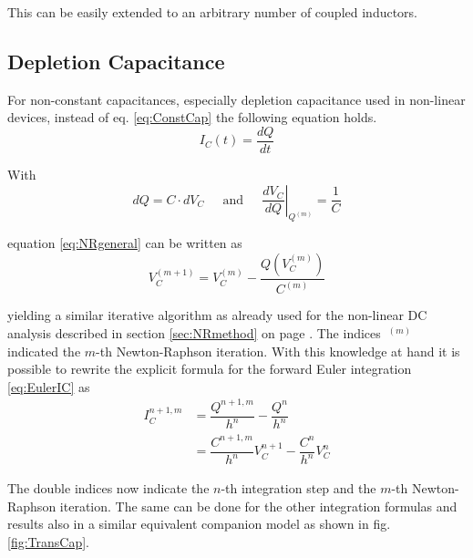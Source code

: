 This can be easily extended to an arbitrary number of coupled
inductors.


\subsection{Depletion Capacitance}

For non-constant capacitances, especially depletion capacitance used
in non-linear devices, instead of eq. \eqref{eq:ConstCap} the
following equation holds.
\begin{equation}
I_C(t) = \dfrac{d Q}{d t}
\end{equation}

With
\begin{equation}
d Q = C\cdot d V_C
\;\;\;\; \textrm{ and } \;\;\;\;
\left.\dfrac{d V_C}{d Q}\right|_{Q^{(m)}} = \dfrac{1}{C}
\end{equation}

equation \eqref{eq:NRgeneral} can be written as
\begin{equation}
V_C^{(m + 1)} = V_C^{(m)} - \dfrac{Q\left(V_C^{(m)}\right)}{C^{(m)}}
\end{equation}

yielding a similar iterative algorithm as already used for the
non-linear DC analysis described in section \ref{sec:NRmethod} on page
\pageref{sec:NRmethod}.  The indices $~^{(m)}$ indicated the $m$-th
Newton-Raphson iteration.  With this knowledge at hand it is possible
to rewrite the explicit formula for the forward Euler integration
\eqref{eq:EulerIC} as
\begin{equation}
\begin{split}
I_C^{n+1,m} &= \dfrac{Q^{n+1,m}}{h^{n}} - \dfrac{Q^{n}}{h^{n}}\\
&= \dfrac{C^{n+1,m}}{h^{n}} V_C^{n+1} - \dfrac{C^{n}}{h^{n}} V_C^{n}
\end{split}
\end{equation}

The double indices now indicate the $n$-th integration step and the
$m$-th Newton-Raphson iteration.  The same can be done for the other
integration formulas and results also in a similar equivalent
companion model as shown in fig. \ref{fig:TransCap}.

\addvspace{12pt}


